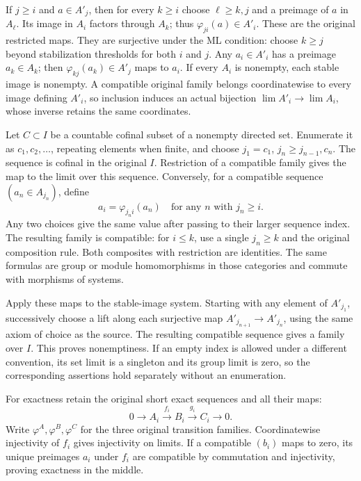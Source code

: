 If \(j\geq i\) and \(a\in A'_j\), then for every \(k\geq i\) choose \(\ell\geq k,j\) and a preimage of \(a\) in \(A_\ell\). Its image in \(A_i\) factors through \(A_k\); thus \(\varphi_{ji}(a)\in A'_i\). These are the original restricted maps. They are surjective under the ML condition: choose \(k\geq j\) beyond stabilization thresholds for both \(i\) and \(j\). Any \(a_i\in A'_i\) has a preimage \(a_k\in A_k\); then \(\varphi_{kj}(a_k)\in A'_j\) maps to \(a_i\). If every \(A_i\) is nonempty, each stable image is nonempty. A compatible original family belongs coordinatewise to every image defining \(A'_i\), so inclusion induces an actual bijection \(\lim A'_i\to\lim A_i\), whose inverse retains the same coordinates.

Let \(C\subset I\) be a countable cofinal subset of a nonempty directed set. Enumerate it as \(c_1,c_2,\ldots\), repeating elements when finite, and choose \(j_1=c_1\), \(j_n\geq j_{n-1},c_n\). The sequence is cofinal in the original \(I\). Restriction of a compatible family gives the map to the limit over this sequence. Conversely, for a compatible sequence \((a_n\in A_{j_n})\), define \[
a_i=\varphi_{j_n i}(a_n)\quad\text{for any }n\text{ with }j_n\geq i.
\] Any two choices give the same value after passing to their larger sequence index. The resulting family is compatible: for \(i\leq k\), use a single \(j_n\geq k\) and the original composition rule. Both composites with restriction are identities. The same formulas are group or module homomorphisms in those categories and commute with morphisms of systems.

Apply these maps to the stable-image system. Starting with any element of \(A'_{j_1}\), successively choose a lift along each surjective map \(A'_{j_{n+1}}\to A'_{j_n}\), using the same axiom of choice as the source. The resulting compatible sequence gives a family over \(I\). This proves nonemptiness. If an empty index is allowed under a different convention, its set limit is a singleton and its group limit is zero, so the corresponding assertions hold separately without an enumeration.

For exactness retain the original short exact sequences and all their maps: \[
0\longrightarrow A_i\xrightarrow{f_i}B_i\xrightarrow{g_i}C_i\longrightarrow0.
\] Write \(\varphi^A,\varphi^B,\varphi^C\) for the three original transition families. Coordinatewise injectivity of \(f_i\) gives injectivity on limits. If a compatible \((b_i)\) maps to zero, its unique preimages \(a_i\) under \(f_i\) are compatible by commutation and injectivity, proving exactness in the middle.

